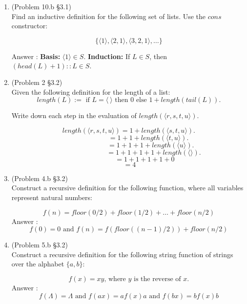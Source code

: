 \documentclass[12pt]{article}
\begin{document}
\begin{enumerate}
\item (Problem 10.b \S 3.1)\\
Find an inductive definition for the following set of lists. Use the $cons$ constructor:

\[\{\langle1\rangle,\langle 2,1\rangle,\langle 3,2,1\rangle,\ldots\}\]

Answer :
\textbf{Basis: }$\langle 1 \rangle \in S$. \textbf{Induction: }If $L\in S$, then $ (head(L) + 1) :: L\in S$.




\item (Problem 2 \S 3.2)\\
Given the following definition for the length of a list:
\[length(L):= \text{ if } L=\langle\ \rangle \text{ then } 0 \text{ else } 1+length(tail(L)).\]

Write down each step in the evaluation of $length(\langle r,s,t,u\rangle)$.

\[length(\langle r,s,t,u\rangle)= 1+length(\langle s,t,u\rangle).\]
\[ \ \ \ \ \ \ \ \ \ \ \ \ \ \ \ \ \ \ \ \ \ \ \ \ \ \ =  1+1+length(\langle t,u\rangle).\]
\[ \ \ \ \ \ \ \ \ \ \ \ \ \ \ \ \ \ \ \ \ \ \ \ \ \ \ \ \ \ =  1+1+1+length(\langle u\rangle).\]
\[ \ \ \ \ \ \ \ \ \ \ \ \ \ \ \ \ \ \ \ \ \ \ \ \ \ \ \ \ \ \ \ \ \ =  1+1+1+1+length(\langle \rangle).\]
\[ \ \ \ \ \ \ \ \ \ \ \ \ \ \ \ \ \ \  \ \ \ =  1+1+1+1+0\]
\[ \  =  4\]


\item (Problem 4.b \S 3.2)\\
Construct a recursive definition for the following function, where all variables represent natural numbers:

\[f(n)=floor(0/2)+floor(1/2)+\ldots+floor(n/2)\]
Answer : 
\[f(0)=0 \text{ and } f(n)=f(floor((n-1)/2)) + floor(n/2)\]




\item (Problem 5.b \S 3.2)\\
Construct a recursive definition for the following string function of strings over the alphabet $\{a,b\}$:

\[f(x)=xy\text{, where }y\text{ is the reverse of }x.\]
Answer : 
\[f(\Lambda)=\Lambda \text{ and }f(ax) = af(x)a \text{ and } f(bx) = bf(x)b \]









\end{enumerate}
\end{document}
